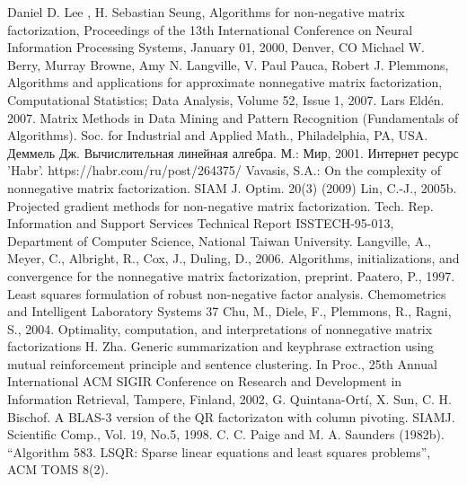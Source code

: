 \newpage
{}

\begin{thebibliography}{9}
   Daniel D. Lee , H. Sebastian Seung, Algorithms for non-negative matrix factorization, Proceedings of the 13th International Conference on Neural Information Processing Systems, January 01, 2000, Denver, CO
   Michael W. Berry, Murray Browne, Amy N. Langville, V. Paul Pauca, Robert J. Plemmons, Algorithms and applications for approximate nonnegative matrix factorization, Computational Statistics; Data Analysis, Volume 52, Issue 1, 2007.
   Lars Eldén. 2007. Matrix Methods in Data Mining and Pattern Recognition (Fundamentals of Algorithms). Soc. for Industrial and Applied Math., Philadelphia, PA, USA.
   Деммель Дж. Вычислительная линейная алгебра. М.: Мир, 2001.
   Интернет ресурс 'Habr'. https://habr.com/ru/post/264375/
   Vavasis, S.A.: On the complexity of nonnegative matrix factorization. SIAM J. Optim. 20(3) (2009)
   Lin, C.-J., 2005b. Projected gradient methods for non-negative matrix factorization. Tech. Rep. Information and Support Services Technical Report ISSTECH-95-013, Department of Computer Science, National Taiwan University.
   Langville, A., Meyer, C., Albright, R., Cox, J., Duling, D., 2006. Algorithms, initializations, and convergence for the nonnegative matrix factorization, preprint.
   Paatero, P., 1997. Least squares formulation of robust non-negative factor analysis. Chemometrics and Intelligent Laboratory Systems 37
   Chu, M., Diele, F., Plemmons, R., Ragni, S., 2004. Optimality, computation, and interpretations of nonnegative matrix factorizations
   H. Zha. Generic summarization and keyphrase extraction using mutual reinforcement principle and sentence clustering. In Proc., 25th Annual International ACM SIGIR Conference on Research and Development in Information Retrieval, Tampere, Finland, 2002,
   G. Quintana-Ortí, X. Sun, C. H. Bischof. A BLAS-3 version of the QR factorizaton with column pivoting. SIAMJ. Scientific Comp., Vol. 19, No.5, 1998.
   C. C. Paige and M. A. Saunders (1982b). “Algorithm 583. LSQR: Sparse linear equations and least squares problems”, ACM TOMS 8(2).
\end{thebibliography}
